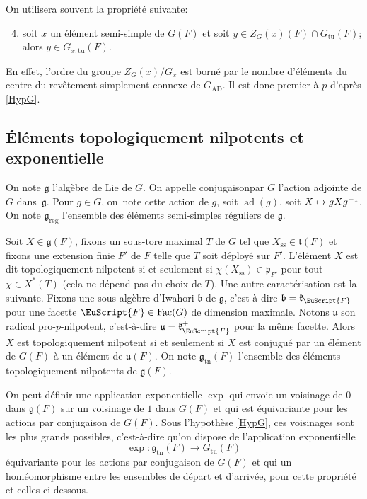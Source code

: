 \documentclass[JEP,XML,SOM,Unicode,francais]{cedram}
\let\mathcal \EuScript
\newcommand\mto{\mathchoice{\longmapsto}{\mapsto}{\mapsto}{\mapsto}}
\newcommand{\frb}{\mathfrak{b}}
\newcommand{\frg}{\mathfrak{g}}
\newcommand{\frk}{\mathfrak{k}}
\newcommand{\frp}{\mathfrak{p}}
\newcommand{\frt}{\mathfrak{t}}
\newcommand{\fru}{\mathfrak{u}}
\newcommand{\AD}{\mathrm{AD}}
\newcommand{\Fac}{\mathrm{Fac}}
\newcommand{\reg}{\mathrm{reg}}
\newcommand{\rss}{\mathrm{ss}}
\newcommand{\tn}{\mathrm{tn}}
\newcommand{\tu}{\mathrm{tu}}
\DeclareMathOperator{\ad}{ad}
\newcommand{\cF}{\mathcal{F}}
\theoremstyle{plain}
\theoremstyle{definition}
\begin{document}
On utilisera souvent la propriété suivante:

\begin{enumerate}\setcounter{enumi}{3}
\item\label{retour4}
soit $x$ un élément semi-simple de $G(F)$ et soit $y\in Z_{G}(x)(F)\cap G_{\tu}(F)$; alors $y\in G_{x,\tu}(F)$.
\end{enumerate}

En effet, l'ordre du groupe $Z_{G}(x)/G_{x}$ est borné par le nombre d'éléments du centre du revêtement simplement connexe de $G_{\AD}$. Il est donc premier à $p$ d'après \ref{HypG}.

\subsection{Éléments topologiquement nilpotents et exponentielle}\label{elementstopologiquement}
On note $\frg$ l'algèbre de Lie de $G$. On appelle \og conjugaison\fg par $G$ l'action adjointe de $G$ dans~$\frg$. Pour $g\in G$, on~note cette action de $g$, soit $\ad(g)$, soit $X\mto gXg^{-1}$. On note $\frg_{\reg}$ l'ensemble des éléments semi-simples réguliers de $\frg$.

Soit $X\in \frg(F)$, fixons un sous-tore maximal $T$ de $G$ tel que $X_{\rss}\in \frt(F)$ et fixons une extension finie $F'$ de $F$ telle que $T$ soit déployé sur $F'$. L'élément $X$ est dit topologiquement nilpotent si et seulement si $ \chi(X_{\rss})\in \frp_{F'}$ pour tout $\chi\in X^*(T)$ (cela ne dépend pas du choix de $T$). Une autre caractérisation est la suivante. Fixons une sous-algèbre d'Iwahori $\frb$ de $\frg$, c'est-à-dire $\frb=\frk_{\cF}$ pour une facette $\cF\in \Fac(G)$ de dimension maximale. Notons $\fru$ son radical pro-$p$-nilpotent, c'est-à-dire $\fru=\frk_{\cF}^+$ pour la même facette. Alors $X$ est topologiquement nilpotent si et seulement si $X$ est conjugué par un élément de $G(F)$ à un élément de $\fru(F)$. On note $\frg_{\tn}(F)$ l'ensemble des éléments topologiquement nilpotents de $\frg(F)$.

On peut définir une application exponentielle $\exp$ qui envoie un voisinage de $0$ dans $\frg(F)$ sur un voisinage de $1$ dans $G(F)$ et qui est équivariante pour les actions par conjugaison de $G(F)$. Sous l'hypothèse \ref{HypG}, ces voisinages sont les plus grands possibles, c'est-à-dire qu'on dispose de l'application exponentielle
\[
\exp:\frg_{\tn}(F)\to G_{\tu}(F)
\]
équivariante pour les actions par conjugaison de $G(F)$ et qui
un homéomorphisme entre les ensembles de départ et d'arrivée, \cf \cite[App.\,B]{DR} pour cette propriété et celles ci-dessous.
\end{document}
